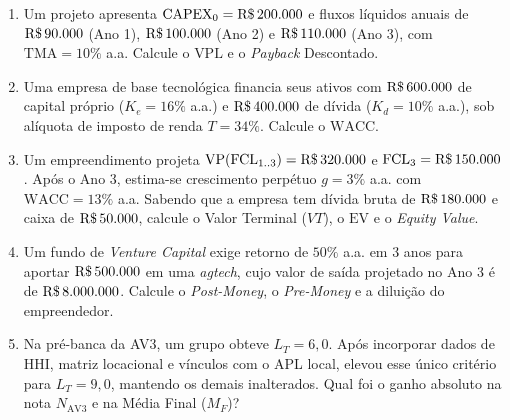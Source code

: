 \begin{enumerate}[leftmargin=1.5em, itemsep=4pt, resume]
  \item Um projeto apresenta $\text{CAPEX}_0 = \text{R\$\,}{200.000}$ e fluxos líquidos anuais de $\text{R\$\,}{90.000}$ (Ano 1), $\text{R\$\,}{100.000}$ (Ano 2) e $\text{R\$\,}{110.000}$ (Ano 3), com $\text{TMA} = 10\%$ a.a. Calcule o $\text{VPL}$ e o \textit{Payback} Descontado.
  \espacoResolucao[2.4cm]

  \item Uma empresa de base tecnológica financia seus ativos com $\text{R\$\,}{600.000}$ de capital próprio ($K_e = 16\%$ a.a.) e $\text{R\$\,}{400.000}$ de dívida ($K_d = 10\%$ a.a.), sob alíquota de imposto de renda $T = 34\%$. Calcule o $\text{WACC}$.
  \espacoResolucao[2.2cm]

  \item Um empreendimento projeta $\text{VP}(\text{FCL}_{1..3}) = \text{R\$\,}{320.000}$ e $\text{FCL}_3 = \text{R\$\,}{150.000}$. Após o Ano 3, estima-se crescimento perpétuo $g = 3\%$ a.a. com $\text{WACC} = 13\%$ a.a. Sabendo que a empresa tem dívida bruta de $\text{R\$\,}{180.000}$ e caixa de $\text{R\$\,}{50.000}$, calcule o Valor Terminal ($VT$), o $\text{EV}$ e o \textit{Equity Value}.
  \espacoResolucao[2.5cm]

  \item Um fundo de \textit{Venture Capital} exige retorno de $50\%$ a.a. em $3$ anos para aportar $\text{R\$\,}{500.000}$ em uma \textit{agtech}, cujo valor de saída projetado no Ano 3 é de $\text{R\$\,}{8.000.000}$. Calcule o \textit{Post-Money}, o \textit{Pre-Money} e a diluição do empreendedor.
  \espacoResolucao[2.4cm]

  \item Na pré-banca da AV3, um grupo obteve $L_T = 6{,}0$. Após incorporar dados de $\text{HHI}$, matriz locacional e vínculos com o APL local, elevou esse único critério para $L_T = 9{,}0$, mantendo os demais inalterados. Qual foi o ganho absoluto na nota $N_{\text{AV3}}$ e na Média Final ($M_F$)?
  \espacoResolucao[2.0cm]
\end{enumerate}


